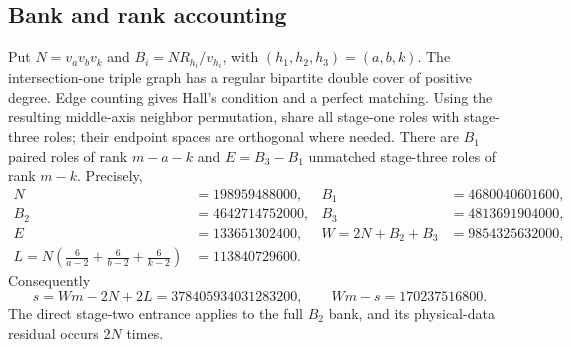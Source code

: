 \subsection{Bank and rank accounting}
Put $N=v_av_bv_k$ and $B_i=NR_{h_i}/v_{h_i}$, with $(h_1,h_2,h_3)=(a,b,k)$.
The intersection-one triple graph has a regular bipartite double cover
of positive degree. Edge counting gives Hall's condition and a perfect
matching. Using the resulting middle-axis neighbor permutation, share all
stage-one roles with stage-three roles; their endpoint spaces are orthogonal
where needed. There are $B_1$ paired roles of rank $m-a-k$ and
$E=B_3-B_1$ unmatched stage-three roles of rank $m-k$. Precisely,
\[
\begin{aligned}
N&=198959488000,& B_1&=4680040601600,\\
B_2&=4642714752000,&B_3&=4813691904000,\\
E&=133651302400,&W=2N+B_2+B_3&=9854325632000,\\
L=N\left(\frac6{a-2}+\frac6{b-2}+\frac6{k-2}\right)&=113840729600.
\end{aligned}
\]
Consequently
\[
 s=Wm-2N+2L=378405934031283200,\qquad Wm-s=170237516800.
\]
The direct stage-two entrance applies to the full $B_2$ bank, and its
physical-data residual occurs $2N$ times.
